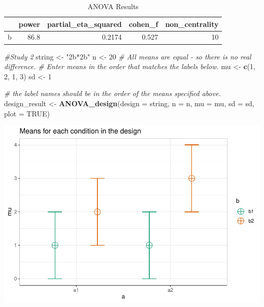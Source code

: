 \documentclass[]{book}
\newenvironment{Shaded}{\begin{snugshade}}{\end{snugshade}}
\newcommand{\CommentTok}[1]{\textcolor[rgb]{0.56,0.35,0.01}{\textit{#1}}}
\newcommand{\DataTypeTok}[1]{\textcolor[rgb]{0.13,0.29,0.53}{#1}}
\newcommand{\DecValTok}[1]{\textcolor[rgb]{0.00,0.00,0.81}{#1}}
\newcommand{\KeywordTok}[1]{\textcolor[rgb]{0.13,0.29,0.53}{\textbf{#1}}}
\newcommand{\NormalTok}[1]{#1}
\newcommand{\OtherTok}[1]{\textcolor[rgb]{0.56,0.35,0.01}{#1}}
\newcommand{\StringTok}[1]{\textcolor[rgb]{0.31,0.60,0.02}{#1}}
\begin{document}
\begin{table}[t]

\caption{\label{tab:unnamed-chunk-161}ANOVA Results}
\centering
\begin{tabular}{l|r|r|r|r}
\hline
  & power & partial\_eta\_squared & cohen\_f & non\_centrality\\
\hline
b & 86.8 & 0.2174 & 0.527 & 10\\
\hline
\end{tabular}
\end{table}

\begin{Shaded}
\begin{Highlighting}[]
\CommentTok{#Study 2}
\NormalTok{string <-}\StringTok{ "2b*2b"}
\NormalTok{n <-}\StringTok{ }\DecValTok{20}
\CommentTok{# All means are equal - so there is no real difference.}
\CommentTok{# Enter means in the order that matches the labels below.}
\NormalTok{mu <-}\StringTok{ }\KeywordTok{c}\NormalTok{(}\DecValTok{1}\NormalTok{, }\DecValTok{2}\NormalTok{, }\DecValTok{1}\NormalTok{, }\DecValTok{3}\NormalTok{) }
\NormalTok{sd <-}\StringTok{ }\DecValTok{1}

\CommentTok{# the label names should be in the order of the means specified above.}
\NormalTok{design_result <-}\StringTok{ }\KeywordTok{ANOVA_design}\NormalTok{(}\DataTypeTok{design =}\NormalTok{ string,}
                   \DataTypeTok{n =}\NormalTok{ n, }
                   \DataTypeTok{mu =}\NormalTok{ mu, }
                   \DataTypeTok{sd =}\NormalTok{ sd, }
                   \DataTypeTok{plot =} \OtherTok{TRUE}\NormalTok{)}
\end{Highlighting}
\end{Shaded}

\includegraphics{SuperpowerValidation_files/figure-latex/unnamed-chunk-161-2.pdf}
\end{document}

